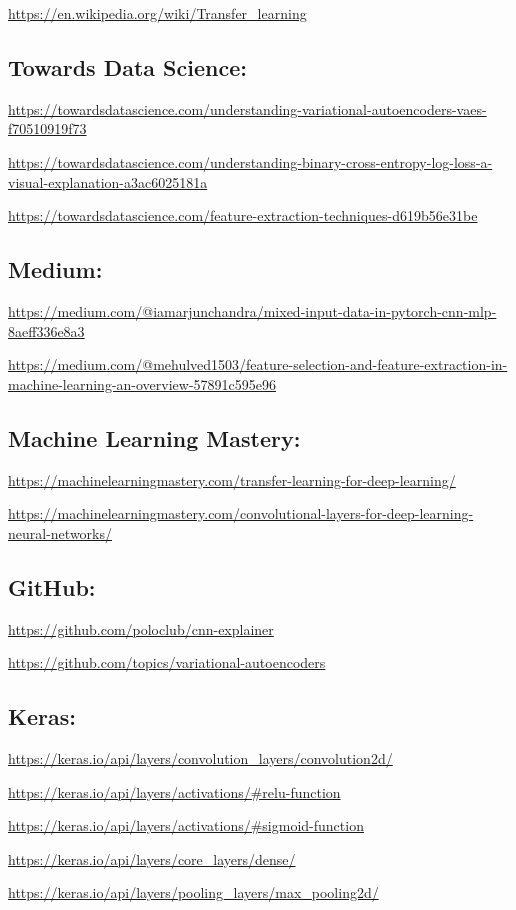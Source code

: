\documentclass[12pt]{report}
\begin{document}
    \url{https://en.wikipedia.org/wiki/Transfer_learning}
    \subsection*{Towards Data Science:}
    \url{https://towardsdatascience.com/understanding-variational-autoencoders-vaes-f70510919f73}

    \url{https://towardsdatascience.com/understanding-binary-cross-entropy-log-loss-a-visual-explanation-a3ac6025181a}

    \url{https://towardsdatascience.com/feature-extraction-techniques-d619b56e31be}
    \subsection*{Medium:}
    \url{https://medium.com/@iamarjunchandra/mixed-input-data-in-pytorch-cnn-mlp-8aeff336e8a3}

    \url{https://medium.com/@mehulved1503/feature-selection-and-feature-extraction-in-machine-learning-an-overview-57891c595e96}

    \subsection*{Machine Learning Mastery:}
    \url{https://machinelearningmastery.com/transfer-learning-for-deep-learning/}

    \url{https://machinelearningmastery.com/convolutional-layers-for-deep-learning-neural-networks/}

    \subsection*{GitHub:}
    \url{https://github.com/poloclub/cnn-explainer}

    \url{https://github.com/topics/variational-autoencoders}

    \subsection{Keras:}
    \url{https://keras.io/api/layers/convolution_layers/convolution2d/}

    \url{https://keras.io/api/layers/activations/#relu-function}

    \url{https://keras.io/api/layers/activations/#sigmoid-function}

    \url{https://keras.io/api/layers/core_layers/dense/}

    \url{https://keras.io/api/layers/pooling_layers/max_pooling2d/}
\end{document}
